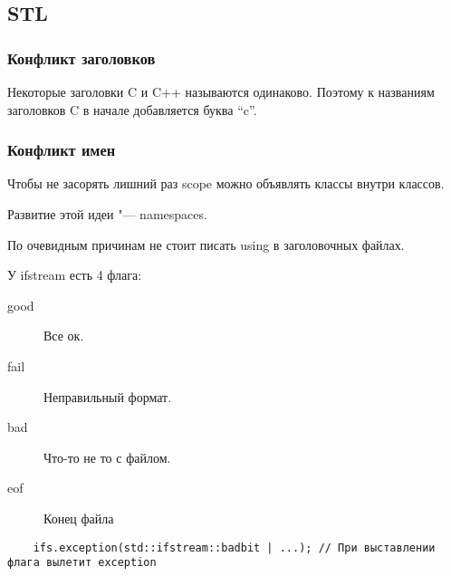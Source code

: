 \subsection{STL}

\subsubsection{Конфликт заголовков}
Некоторые заголовки C и C++ называются одинаково. Поэтому к названиям заголовков C в начале добавляется буква ``c''.

\subsubsection{Конфликт имен}
Чтобы не засорять лишний раз scope можно объявлять классы внутри классов.

Развитие этой идеи "--- namespaces.

\begin{remark}
    По очевидным причинам не стоит писать using в заголовочных файлах.
\end{remark}

У ifstream есть 4 флага:
\begin{description}
    \item[good] Все ок.
    \item[fail] Неправильный формат.
    \item[bad]  Что-то не то с файлом.
    \item[eof]  Конец файла
\end{description}

\begin{verbatim}
    ifs.exception(std::ifstream::badbit | ...); // При выставлении флага вылетит exception
\end{verbatim}
